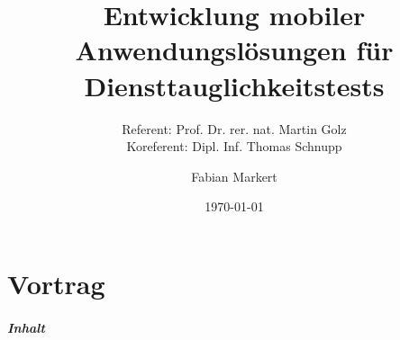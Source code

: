 \title{Entwicklung mobiler Anwendungslösungen für Diensttauglichkeitstests}
\subtitle{Referent: Prof. Dr. rer. nat. Martin Golz \\
Koreferent: Dipl. Inf. Thomas Schnupp}
\author{Fabian Markert}
\date{\today}
\begin{frame}[plain]
  \titlepage
\end{frame}
 \part{Vortrag}
 \begin{frame}
 	\frametitle{Inhalt}
 	\tableofcontents[%
 		pausesubsections, %
 	]
 \end{frame}